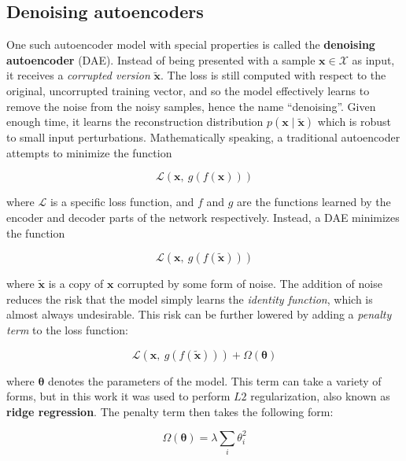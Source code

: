 \documentclass[11pt]{article}
\theoremstyle{remark}
\begin{document}
\subsection{Denoising autoencoders}

One such autoencoder model with special properties is called the \textbf{denoising autoencoder} (DAE). Instead of being presented with a sample $\bm{x} \in \mathcal{X}$ as input, it receives a \textit{corrupted version} $\bm{\tilde{x}}$. The loss is still computed with respect to the original, uncorrupted training vector, and so the model effectively learns to remove the noise from the noisy samples, hence the name ``denoising''. Given enough time, it learns the reconstruction distribution $p(\bm{x} \mid \bm{\tilde{x}})$ which is robust to small input perturbations. Mathematically speaking, a traditional autoencoder attempts to minimize the function

\begin{equation}
  \mathcal{L}(\bm{x},\ g(f(\bm{x})))
\end{equation}

\noindent where $\mathcal{L}$ is a specific loss function, and $f$ and $g$ are the functions learned by the encoder and decoder parts of the network respectively. Instead, a DAE minimizes the function

\begin{equation}
  \mathcal{L}(\bm{x},\ g(f(\bm{\tilde{x}})))
\end{equation}

\noindent where $\bm{\tilde{x}}$ is a copy of $\bm{x}$ corrupted by some form of noise. The addition of noise reduces the risk that the model simply learns the \textit{identity function}, which is almost always undesirable. This risk can be further lowered by adding a \textit{penalty term} to the loss function:

\begin{equation}
  \mathcal{L}(\bm{x},\ g(f(\bm{\tilde{x}}))) + \Omega(\bm{\theta})
\end{equation}

\noindent where $\bm{\theta}$ denotes the parameters of the model. This term can take a variety of forms, but in this work it was used to perform $L2$ regularization, also known as \textbf{ridge regression}. The penalty term then takes the following form:

\begin{equation}
  \Omega(\bm{\theta}) = \lambda \sum_i \theta_i^2
\end{equation}
\end{document}
